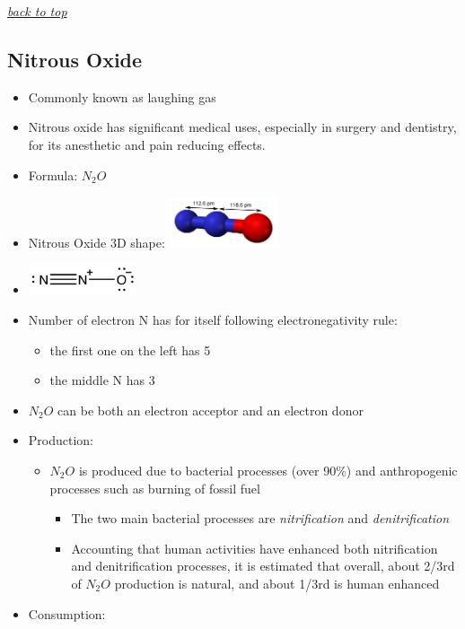\documentclass[]{book}
\providecommand{\tightlist}{%
  \setlength{\itemsep}{0pt}\setlength{\parskip}{0pt}}
\theoremstyle{definition}
\theoremstyle{definition}
\theoremstyle{definition}
\theoremstyle{remark}
\begin{document}
\emph{\protect\hyperlink{top}{back to top}}

\subsection{Nitrous Oxide}\label{nitrous-oxide}

\begin{itemize}
\item
  Commonly known as laughing gas
\item
  Nitrous oxide has significant medical uses, especially in surgery and
  dentistry, for its anesthetic and pain reducing effects.
\item
  Formula: \(N_2O\)
\item
  Nitrous Oxide 3D shape:
  \includegraphics[width=0.25000\textwidth]{pictures/Nitrous-oxide-dimensions-3D-balls.png}
\item
  \includegraphics[width=0.25000\textwidth]{pictures/N2O_lewis_structure.png}
\item
  Number of electron N has for itself following electronegativity rule:

  \begin{itemize}
  \tightlist
  \item
    the first one on the left has 5
  \item
    the middle N has 3
  \end{itemize}
\item
  \(N_2O\) can be both an electron acceptor and an electron donor
\item
  Production:

  \begin{itemize}
  \tightlist
  \item
    \(N_2O\) is produced due to bacterial processes (over 90\%) and
    anthropogenic processes such as burning of fossil fuel

    \begin{itemize}
    \tightlist
    \item
      The two main bacterial processes are \emph{nitrification} and
      \emph{denitrification}
    \item
      Accounting that human activities have enhanced both nitrification
      and denitrification processes, it is estimated that overall, about
      2/3rd of \(N_2O\) production is natural, and about 1/3rd is human
      enhanced
    \end{itemize}
  \end{itemize}
\item
  Consumption:


\end{itemize}
\end{document}
